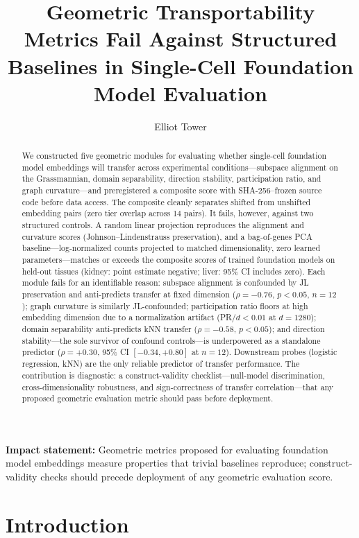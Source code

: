\documentclass[9pt,lineno]{elife}
\title{Geometric Transportability Metrics Fail Against Structured Baselines in Single-Cell Foundation Model Evaluation}
\author[1]{Elliot Tower}
\affil[1]{Independent Researcher}
\begin{document}
\maketitle

\begin{abstract}
We constructed five geometric modules for evaluating whether single-cell foundation model embeddings will transfer across experimental conditions---subspace alignment on the Grassmannian, domain separability, direction stability, participation ratio, and graph curvature---and preregistered a composite score with SHA-256--frozen source code before data access. The composite cleanly separates shifted from unshifted embedding pairs (zero tier overlap across 14 pairs). It fails, however, against two structured controls. A random linear projection reproduces the alignment and curvature scores (Johnson--Lindenstrauss preservation), and a bag-of-genes PCA baseline---log-normalized counts projected to matched dimensionality, zero learned parameters---matches or exceeds the composite scores of trained foundation models on held-out tissues (kidney: point estimate negative; liver: 95\% CI includes zero). Each module fails for an identifiable reason: subspace alignment is confounded by JL preservation and anti-predicts transfer at fixed dimension ($\rho = -0.76$, $p < 0.05$, $n = 12$); graph curvature is similarly JL-confounded; participation ratio floors at high embedding dimension due to a normalization artifact (PR$/d < 0.01$ at $d = 1280$); domain separability anti-predicts kNN transfer ($\rho = -0.58$, $p < 0.05$); and direction stability---the sole survivor of confound controls---is underpowered as a standalone predictor ($\rho = +0.30$, 95\% CI $[-0.34, +0.80]$ at $n = 12$). Downstream probes (logistic regression, kNN) are the only reliable predictor of transfer performance. The contribution is diagnostic: a construct-validity checklist---null-model discrimination, cross-dimensionality robustness, and sign-correctness of transfer correlation---that any proposed geometric evaluation metric should pass before deployment.
\end{abstract}

\noindent\textbf{Impact statement:} Geometric metrics proposed for evaluating foundation model embeddings measure properties that trivial baselines reproduce; construct-validity checks should precede deployment of any geometric evaluation score.


\section{Introduction}
\end{document}
